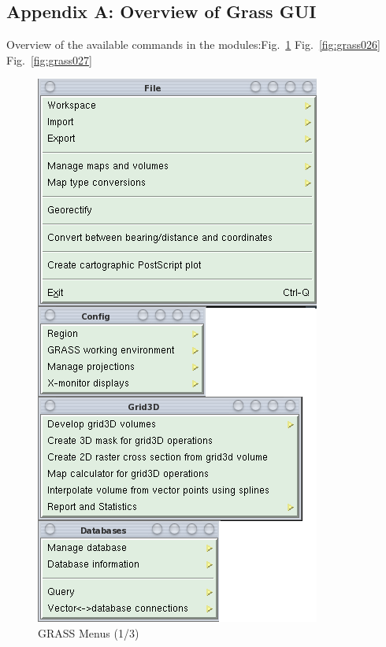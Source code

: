 \newpage

\subsection{Appendix A: Overview of Grass GUI}
\label{appendixA}

Overview of the available commands in the modules:Fig.~\ref{fig:grass025} Fig.~\ref{fig:grass026} Fig.~\ref{fig:grass027}

\begin{figure}[htbp]
   \centering
   \includegraphics[scale=0.4]{grass025.png}
   \caption{GRASS Menus (1/3)}
   \label{fig:grass025}
\end{figure}

